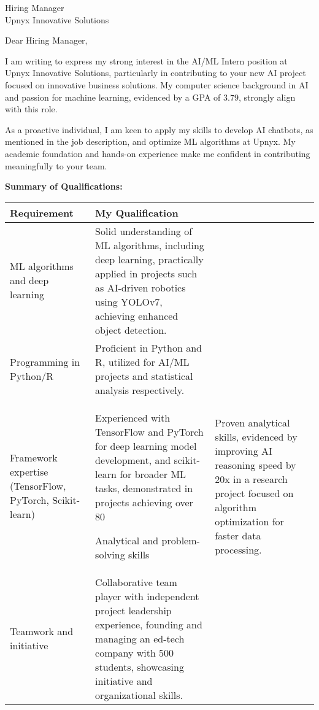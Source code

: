 \documentclass[10.5pt]{letter}
\date{\today}
\begin{document}
\begin{letter}{Hiring Manager\\
Upnyx Innovative Solutions\\
 [Redacted due to PII in provided prompt] }

\opening{Dear Hiring Manager,}

I am writing to express my strong interest in the AI/ML Intern position at Upnyx Innovative Solutions, particularly in contributing to your new AI project focused on innovative business solutions.  My computer science background in AI and passion for machine learning, evidenced by a GPA of 3.79, strongly align with this role.

As a proactive individual, I am keen to apply my skills to develop AI chatbots, as mentioned in the job description, and optimize ML algorithms at Upnyx. My academic foundation and hands-on experience make me confident in contributing meaningfully to your team.

\vspace{0.2cm}
\textbf{Summary of Qualifications:}
\vspace{0.1cm}

\renewcommand{\arraystretch}{1.3}
\begin{tabularx}{\textwidth}{@{}p{}X@{}}
\textbf{Requirement} & \textbf{My Qualification} \\

\hline
ML algorithms and deep learning & Solid understanding of ML algorithms, including deep learning, practically applied in projects such as AI-driven robotics using YOLOv7, achieving enhanced object detection. \\

Programming in Python/R & Proficient in Python and R, utilized for AI/ML projects and statistical analysis respectively. \\

Framework expertise (TensorFlow, PyTorch, Scikit-learn) & Experienced with TensorFlow and PyTorch for deep learning model development, and scikit-learn for broader ML tasks, demonstrated in projects achieving over 80%

Analytical and problem-solving skills & Proven analytical skills, evidenced by improving AI reasoning speed by 20x in a research project focused on algorithm optimization for faster data processing. \\

Teamwork and initiative & Collaborative team player with independent project leadership experience, founding and managing an ed-tech company with 500 students, showcasing initiative and organizational skills. \\


\end{tabularx}
\end{letter}
\end{document}
